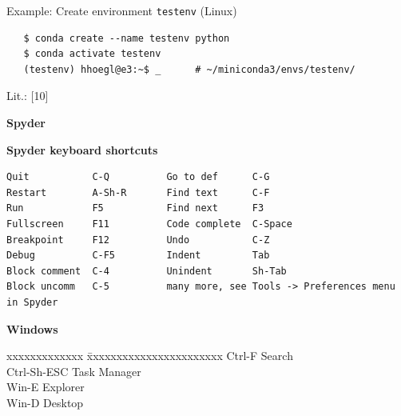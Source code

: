 \documentclass[9pt,a4wide]{extarticle}
\begin{document}
Example: Create environment {\tt testenv} (Linux)

\begin{verbatim}
   $ conda create --name testenv python
   $ conda activate testenv
   (testenv) hhoegl@e3:~$ _      # ~/miniconda3/envs/testenv/
\end{verbatim}

Lit.: [10]




\medskip
{\bf Spyder}

{\bf Spyder keyboard shortcuts}

\begin{verbatim}
Quit           C-Q          Go to def      C-G
Restart        A-Sh-R       Find text      C-F
Run            F5           Find next      F3
Fullscreen     F11          Code complete  C-Space
Breakpoint     F12          Undo           C-Z
Debug          C-F5         Indent         Tab
Block comment  C-4          Unindent       Sh-Tab
Block uncomm   C-5          many more, see Tools -> Preferences menu in Spyder
\end{verbatim}      


\medskip

{\bf Windows}


\begin{tabbing}
    xxxxxxxxxxxxx \= xxxxxxxxxxxxxxxxxxxxxxx \kill
    Ctrl-F        \> Search  \\
    Ctrl-Sh-ESC   \> Task Manager \\
    Win-E         \> Explorer \\
    Win-D         \> Desktop  \\
\end{tabbing}

\medskip



\end{document}
